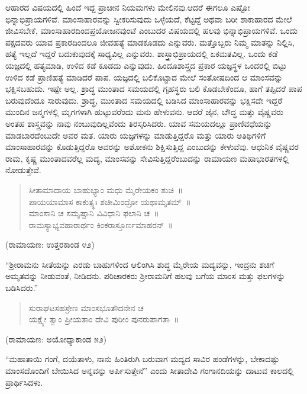 ಆಹಾರದ ವಿಷಯದಲ್ಲಿ ಹಿಂದೆ ಇದ್ದ ಪ್ರಾಚೀನ ನಿಯಮಗಳು ಮೇಲಿನವು.ಆದರೆ ಈಗಲೂ ಎಷ್ಟೋ ಭಿನ್ನಾಭಿಪ್ರಾಯಗಳಿವೆ. ಮಾಂಸಾಹಾರವನ್ನು ಸ್ವೀಕರಿಸುವುದು ಒಳ್ಳೆಯದೆ, ಕೆಟ್ಟದ್ದೆ ಅಥವಾ ಬರೀ ಶಾಕಾಹಾರದ ಮೇಲೆ ಜೀವಿಸಬೇಕೆ, ಮಾಂಸಾಹಾರದಿಂದ\break ಪ್ರಯೋಜನವುಂಟೆ ಎಂಬುದರ ವಿಷಯದಲ್ಲಿ ಹಲವು ಭಿನ್ನಾಭಿಪ್ರಾಯಗಳಿವೆ. ಒಂದು ಪಕ್ಷದವರು ಯಾವ ಪ್ರಕಾರದಿಂದಲೂ ಜೀವಹತ್ಯೆ ಮಾಡಕೂಡದು ಎನ್ನುವರು. ಮತ್ತೊಬ್ಬರು ನಿಮ್ಮ ಮಾತನ್ನು ನಿಲ್ಲಿಸಿ, ಹತ್ಯೆ ಇಲ್ಲದೆ ಇದ್ದರೆ ಬದುಕುವುದಕ್ಕೆ ಸಾಧ್ಯವಿಲ್ಲ ಎನ್ನುವರು. ಶಾಸ್ತ್ರಾಭಿಪ್ರಾಯದಲ್ಲಿ ಏಕಮತವಿಲ್ಲ. ಒಂದು ಕಡೆ ಯಜ್ಞದಲ್ಲಿ ಹತ್ಯಮಾಡಿ, ಉಳಿದ ಕಡೆ ಕೂಡದು ಎನ್ನುವುದು. ಹಿಂದೂಶಾಸ್ತ್ರದ ಪ್ರಕಾರ ಯಜ್ಞಸ್ಥಳ ಒಂದರಲ್ಲಿ ಬಿಟ್ಟು ಉಳಿದ ಕಡೆ ಪ್ರಾಣಿಹತ್ಯೆ ಮಾಡಿದರೆ ಪಾಪ. ಯಜ್ಞದಲ್ಲಿ ಬಲಿಕೊಟ್ಟಾದ ಮೇಲೆ ಸಂತೋಷದಿಂದ ಆ ಮಾಂಸವನ್ನು ಭಕ್ಷಿಸಬಹುದು. ಇಷ್ಟೇ ಅಲ್ಲ. ಶ್ರಾದ್ಧ ಮುಂತಾದ ಸಮಯದಲ್ಲಿ ಗೃಹಸ್ಥರು ಬಲಿ ಕೊಡಬೇಕೆಂದೂ, ಹಾಗೆ ತಪ್ಪಿದರೆ ಪಾಪ ಬರುವುದೆಂದೂ ಸಾರುವುದು. ಶ್ರಾದ್ಧ, ಮುಂತಾದ ಸಮಯದಲ್ಲಿ ಬಡಿಸಿದ ಮಾಂಸಾಹಾರವನ್ನು ಭಕ್ಷಿಸದೇ ಇದ್ದರೆ ಮುಂದಿನ ಜನ್ಮಗಳಲ್ಲಿ ಮೃಗಗಳಾಗಿ ಹುಟ್ಟುವರೆಂದು ಮನು ಹೇಳುವನು. ಆದರೆ ಜೈನ, ಬೌದ್ಧ ಮತ್ತು ವೈಷ್ಣವರು ಅಂತಹ ಶಾಸ್ತ್ರವನ್ನು ನಾವು ನಂಬುವುದಿಲ್ಲವೆಂದು ತಿರಸ್ಕರಿಸಿದರು. ಯಾವ ಸಮಯದಲ್ಲೂ ಪ್ರಾಣಿವಧೆಯನ್ನು ಮಾಡಬಾರದೆಂಬುದೇ ಅವರ ಮತ. ಯಾರು ಯಜ್ಞಗಳನ್ನು ಮಾಡುತ್ತಿದ್ದರೊ ಮತ್ತು ಯಾರು ಅತಿಥಿಗಳಿಗೆ ಮಾಂಸಾಹಾರವನ್ನು ಕೊಡುತ್ತಿದ್ದರೊ ಅವರನ್ನು ಅಶೋಕನು ಶಿಕ್ಷಿಸುತ್ತಿದ್ದ ಎಂಬುದನ್ನು ಕೇಳುವೆವು. ಆಧುನಿಕ ವೈಷ್ಣವರ ರಾಮ, ಕೃಷ್ಣ ಮುಂತಾದವರೆಲ್ಲ ಮದ್ಯ, ಮಾಂಸವನ್ನು ಸೇವಿಸುತ್ತಿದ್ದರೆಂಬುದನ್ನು ರಾಮಾಯಣ ಮಹಾಭಾರತಗಳಲ್ಲಿ ನೋಡುತ್ತೇವೆ.

\begin{verse}
ಸೀತಾಮಾದಾಯ ಬಾಹುಭ್ಯಾಂ ಮಧು ಮೈರೇಯಕಂ ಶುಚಿ~॥\\ಪಾಯಯಾಮಾಸ ಕಾಕುತ್ಸ್ಥಃ ಶಚೀಮಿಂದ್ರೋ ಯಥಾಮೃತಮ್​~॥\\ಮಾಂಸಾನಿ ಚ ಸಮೃಷ್ಟಾನಿ ವಿವಿಧಾನಿ ಫಲಾನಿ ಚ~॥\\ರಾಮಸ್ಯಾಭ್ಯವಹಾರಾರ್ಥಂ ಕಿಂಕರಾಸ್ತೂರ್ಣಮಾಹರನ್​~॥
\end{verse}

\begin{flushright}
(ರಾಮಾಯಣ: ಉತ್ತರಕಾಂಡ ೪೨)
\end{flushright}

“ಶ‍್ರೀರಾಮನು ಸೀತೆಯನ್ನು ಎರಡು ಬಾಹುಗಳಿಂದ ಆಲಿಂಗಿಸಿ ಶುದ್ಧ ಮೈರೇಯ ಮದ್ಯವನ್ನು, ಇಂದ್ರನು ಶಚಿಗೆ ಅಮೃತವನ್ನು ನೀಡುವಂತೆ, ನೀಡಿದನು. ಪರಿಚಾರಕರು ಶ‍್ರೀರಾಮನಿಗೆ ಹಲವು ಬಗೆಯ ಮಾಂಸ ಮತ್ತು ಫಲಗಳನ್ನು ಬಡಿಸಿದರು.”

\newpage

\begin{verse}
ಸುರಾಘಟಸಹಸ್ರೇಣ ಮಾಂಸಭೂತೌದನೇನ ಚ\\ಯಕ್ಷ್ಯೇ ತ್ವಾಂ ಪ್ರೀಯತಾಂ ದೇವಿ ಪುರೀಂ ಪುನರುಪಾಗತಾ~॥
\end{verse}

\begin{flushright}
(ರಾಮಾಯಣ: ಅಯೋಧ್ಯಾಕಾಂಡ ೫೨)
\end{flushright}

“ಮಹಾತಾಯಿ ಗಂಗೆ, ದಯೆತಾಳು, ನಾನು ಹಿಂತಿರುಗಿ ಬರುವಾಗ ಮದ್ಯದ ಸಾವಿರ ಹಂಡೆಗಳನ್ನು, ಬೇಕಾದಷ್ಟು ಮಾಂಸದೊಂದಿಗೆ ಬೇಯಿಸಿದ ಅನ್ನವನ್ನು ಅರ್ಪಿಸುತ್ತೇನೆ” ಎಂದು ಸೀತಾದೇವಿ ಗಂಗಾನದಿಯನ್ನು ದಾಟುವ ಕಾಲದಲ್ಲಿ ಪ್ರಾರ್ಥಿಸಿದಳು.

